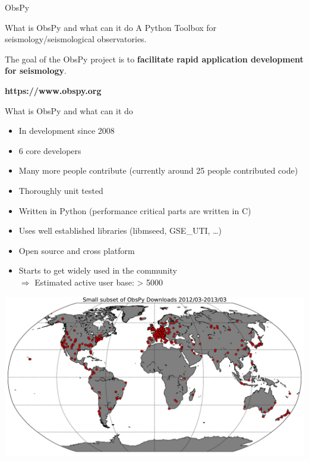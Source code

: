 \documentclass[handout]{beamer}
\begin{document}
\begin{frame}[plain]
        \begin{center}
        \textcolor{lmu@darkgreen}{\Large{ObsPy}}
        \end{center}
\end{frame}

\begin{frame}[plain]{What is ObsPy and what can it do}
    A Python Toolbox for seismology/seismological observatories.

    \vspace{2em}

    The goal of the ObsPy project is to \textbf{facilitate rapid application development for seismology}.

    \vspace{3em}

    \large
    \begin{center}
        \textbf{https://www.obspy.org}
    \end{center}
\end{frame}


\begin{frame}{What is ObsPy and what can it do}
    \begin{itemize}
        \item In development since 2008
        \item 6 core developers
        \item Many more people contribute (currently around 25 people contributed code)
        \item Thoroughly unit tested
        \item Written in Python (performance critical parts are written in C)
        \item Uses well established libraries (libmseed, GSE\_UTI, \dots)
        \item Open source and cross platform
        \item Starts to get widely used in the community \\ $\Rightarrow$ Estimated active user base: > 5000
    \end{itemize}
\end{frame}

\begin{frame}[plain]
\includegraphics[width=\textwidth]{./Scripts/ObsPyUsers.pdf}
\end{frame}
\end{document}

